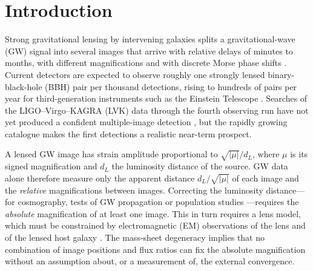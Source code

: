 \section{Introduction}
\label{sec:introduction}
Strong gravitational lensing by intervening galaxies splits a gravitational-wave (GW) signal into several images that arrive with relative delays of minutes to months, with different magnifications and with discrete Morse phase shifts \citep{takahashi2003waveeffects,dai2017morse,ezquiaga2021phase}. Current detectors are expected to observe roughly one strongly lensed binary-black-hole (BBH) pair per thousand detections, rising to hundreds of pairs per year for third-generation instruments such as the Einstein Telescope \citep[ET;][]{ng2018rates,li2018statistical,oguri2018distribution,wierda2021beyond}. Searches of the LIGO--Virgo--KAGRA (LVK) data through the fourth observing run have not yet produced a confident multiple-image detection \citep{hannuksela2019search,lvk2021o3a,lvk2024o3search,lvk2025gwtc4lensing}, but the rapidly growing catalogue \citep{lvk2025gwtc4} makes the first detections a realistic near-term prospect.

A lensed GW image has strain amplitude proportional to $\sqrt{|\mu|}/d_L$, where $\mu$ is its signed magnification and $d_L$ the luminosity distance of the source. GW data alone therefore measure only the apparent distance $d_L/\sqrt{|\mu|}$ of each image and the \emph{relative} magnifications between images. Correcting the luminosity distance---for cosmography, tests of GW propagation or population studies \citep{liao2017precision,oguri2019review}---requires the \emph{absolute} magnification of at least one image. This in turn requires a lens model, which must be constrained by electromagnetic (EM) observations of the lens and of the lensed host galaxy \citep{hannuksela2020localizing,wempe2022lensing,smith2023discovering,uronen2026galacticcentres}. The mass-sheet degeneracy \citep{falco1985msd,schneider2013msd} implies that no combination of image positions and flux ratios can fix the absolute magnification without an assumption about, or a measurement of, the external convergence.

